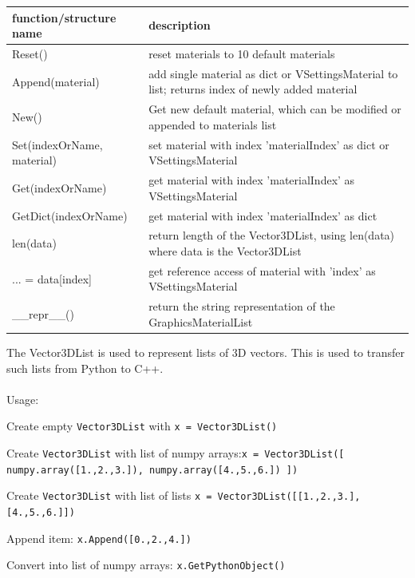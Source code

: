 \begin{center}
\footnotesize
\begin{longtable}{| p{8cm} | p{8cm} |} 
\hline
{\bf function/structure name} & {\bf description}\\ \hline
  Reset() & reset materials to 10 default materials\\ \hline 
  Append(material) & add single material as dict or VSettingsMaterial to list; returns index of newly added material\\ \hline 
  New() & Get new default material, which can be modified or appended to materials list\\ \hline 
  Set(indexOrName, material) & set material with index 'materialIndex' as dict or VSettingsMaterial\\ \hline 
  Get(indexOrName) & get material with index 'materialIndex' as VSettingsMaterial\\ \hline 
  GetDict(indexOrName) & get material with index 'materialIndex' as dict\\ \hline 
  len(data) & return length of the Vector3DList, using len(data) where data is the Vector3DList\\ \hline 
  ... = data[index] & get reference access of material with 'index' as VSettingsMaterial\\ \hline 
  \_\_repr\_\_() & return the string representation of the GraphicsMaterialList\\ \hline 
\end{longtable}
\end{center}

The Vector3DList is used to represent lists of 3D vectors. This is used to transfer such lists from Python to C++. \\ \\ Usage:
\bi
  \item Create empty \texttt{Vector3DList} with \texttt{x = Vector3DList()} 
  \item Create \texttt{Vector3DList} with list of numpy arrays:\texttt{x = Vector3DList([ numpy.array([1.,2.,3.]), numpy.array([4.,5.,6.]) ])}
  \item Create \texttt{Vector3DList} with list of lists \texttt{x = Vector3DList([[1.,2.,3.], [4.,5.,6.]])}
  \item Append item: \texttt{x.Append([0.,2.,4.])}
  \item Convert into list of numpy arrays: \texttt{x.GetPythonObject()}
\ei


